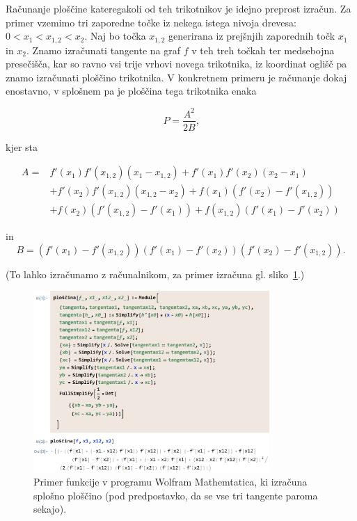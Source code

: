 \documentclass[a4paper, 12pt, titlepage]{article}
\begin{document}
Računanje ploščine kateregakoli od teh trikotnikov je idejno preprost izračun. Za primer vzemimo tri zaporedne točke iz nekega istega nivoja drevesa: $ 0 < x_1 < x_{1,2} < x_2 $. Naj bo točka $ x_{1,2} $ generirana iz prejšnjih zaporednih točk $ x_1 $ in $ x_2 $. Znamo izračunati tangente na graf $ f $ v teh treh točkah ter medsebojna presečišča, kar so ravno vsi trije vrhovi novega trikotnika, iz koordinat oglišč pa znamo izračunati ploščino trikotnika. V konkretnem primeru je računanje dokaj enostavno, v splošnem pa je ploščina tega trikotnika enaka 

\begin{equation}
    \label{splosna_ploscina_formula}
    P = \frac{A^2}{2B}\text{,}
\end{equation}

kjer sta

\begin{align*}
    A =  &f'(x_1)f'(x_{1,2})(x_1 - x_{1,2}) + f'(x_1)f'(x_2)(x_2 - x_1) \\
&+ f'(x_2)f'(x_{1,2})(x_{1,2} - x_2) + f(x_1)(f'(x_2) - f'(x_{1,2})) \\
&+ f(x_2)(f'(x_{1,2}) - f'(x_1)) + f(x_{1,2})(f'(x_1) - f'(x_2))
\end{align*}

in
$$
B = (f'(x_1) - f'(x_{1,2}))(f'(x_1) - f'(x_2))(f'(x_2) - f'(x_{1,2}))\text{.}
$$

(To lahko izračunamo z računalnikom, za primer izračuna gl. sliko~\ref{splosna_ploscina}.)

\begin{figure}[h!]
    \centering
    \includegraphics[width=0.8\textwidth]{slike/splosna_ploscina.png}
    \caption{Primer funkcije v programu Wolfram Mathemtatica, ki izračuna splošno ploščino (pod predpostavko, da se vse tri tangente paroma sekajo).}
    \label{splosna_ploscina}
\end{figure}
\end{document}
